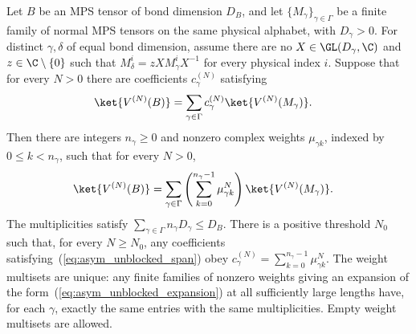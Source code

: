\begin{lemma}
    \label{thm:asym_unblocked_coefficients}
    \leanok
    Let $B$ be an MPS tensor of bond dimension $D_B$, and let
    $\{M_\gamma\}_{\gamma\in\Gamma}$ be a finite family of normal MPS
    tensors on the same physical alphabet, with $D_\gamma>0$.
    For distinct $\gamma,\delta$ of equal bond dimension, assume there
    are no $X\in\GL(D_\gamma,\C)$ and $z\in\C\setminus\{0\}$ such that
    $M_\delta^i=zXM_\gamma^iX^{-1}$ for every physical index $i$.
    Suppose that for every $N>0$ there are coefficients $c_\gamma^{(N)}$
    satisfying
    \begin{align}
        \ket{V^{(N)}(B)}
         & =\sum_{\gamma\in\Gamma}c_\gamma^{(N)}
        \ket{V^{(N)}(M_\gamma)}.
        \label{eq:asym_unblocked_span}
    \end{align}
    Then there are integers $n_\gamma\geq0$ and nonzero complex weights
    $\mu_{\gamma k}$, indexed by $0\leq k<n_\gamma$, such that for every
    $N>0$,
    \begin{align}
        \ket{V^{(N)}(B)}
         & =\sum_{\gamma\in\Gamma}
        \left(\sum_{k=0}^{n_\gamma-1}\mu_{\gamma k}^{N}\right)
        \ket{V^{(N)}(M_\gamma)}.
        \label{eq:asym_unblocked_expansion}
    \end{align}
    The multiplicities satisfy $\sum_{\gamma\in\Gamma}n_\gamma D_\gamma\leq D_B$.
    There is a positive threshold $N_0$ such that, for every $N\geq N_0$,
    any coefficients satisfying~(\ref{eq:asym_unblocked_span}) obey
    $c_\gamma^{(N)}=\sum_{k=0}^{n_\gamma-1}\mu_{\gamma k}^{N}$.
    The weight multisets are unique: any finite families of nonzero
    weights giving an expansion of the form~(\ref{eq:asym_unblocked_expansion})
    at all sufficiently large lengths have, for each $\gamma$, exactly
    the same entries with the same multiplicities. Empty weight
    multisets are allowed.
\end{lemma}

